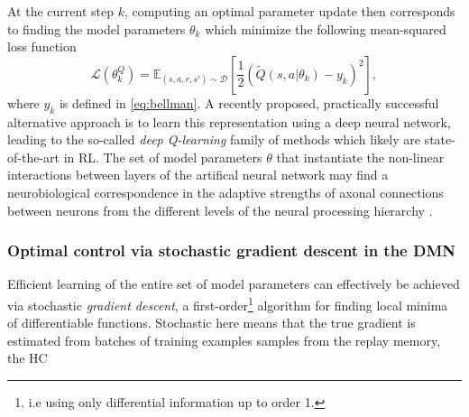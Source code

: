 \documentclass[10pt,letterpaper]{article}
\begin{document}
At the current step $k$, computing an optimal parameter update then corresponds to
finding the model parameters $\theta_{k}$ which minimize the following mean-squared loss function
\begin{equation}
  \mathcal L(\theta^Q_{k})
  = \mathbb E_{(s, a, r, s') \sim \mathcal D}\left[\frac{1}{2}(\tilde{Q}(s, a|\theta_{k}) - y_k)^2\right],
  \label{eq:oracle}
\end{equation}
where $y_k$ is defined in \eqref{eq:bellman}.
A recently proposed, practically successful alternative approach
\citep{mnih2015,silver2016mastering} is to learn this
representation using a deep neural network, leading to the
so-called \textit{deep Q-learning} family of methods which
likely are state-of-the-art in RL.
The set of model parameters $\theta$ that instantiate the non-linear interactions
between layers of the artifical neural network
may find a neurobiological correspondence in the adaptive strengths of axonal
connections between neurons from the different levels
of the neural processing hierarchy
\citep{mesulam1998sensation, taylor2015global}.


\subsubsection{Optimal control via stochastic gradient descent in the DMN}
Efficient learning of the entire set of model parameters can effectively be achieved
via stochastic \textit{gradient descent}, a first-order\footnote{ i.e using only differential information up to order 1.} algorithm for finding
local minima of differentiable functions.
Stochastic here means that the true gradient is estimated from batches of training examples samples from the replay memory, the HC

\end{document}
